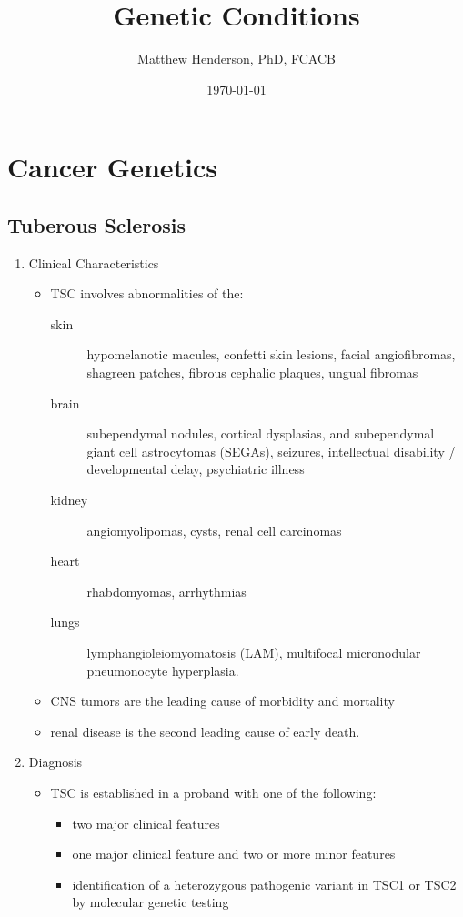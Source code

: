 \documentclass[12pt]{scrartcl}
\author{Matthew Henderson, PhD, FCACB}
\date{\today}
\title{Genetic Conditions}
\begin{document}
\maketitle
\setcounter{tocdepth}{2}
\tableofcontents


\section{Cancer Genetics}
\label{sec:org6510d46}
\subsection{Tuberous Sclerosis}
\label{sec:orgea0665a}
\begin{enumerate}
\item Clinical Characteristics
\label{sec:org8291ab3}
\begin{itemize}
\item TSC involves abnormalities of the:
\begin{description}
\item[{skin}] hypomelanotic macules, confetti skin lesions, facial
angiofibromas, shagreen patches, fibrous cephalic plaques,
ungual fibromas
\item[{brain}] subependymal nodules, cortical dysplasias, and
subependymal giant cell astrocytomas (SEGAs), seizures,
intellectual disability / developmental delay,
psychiatric illness
\item[{kidney}] angiomyolipomas, cysts, renal cell carcinomas
\item[{heart}] rhabdomyomas, arrhythmias
\item[{lungs}] lymphangioleiomyomatosis (LAM), multifocal micronodular
pneumonocyte hyperplasia.
\end{description}
\item CNS tumors are the leading cause of morbidity and mortality
\item renal disease is the second leading cause of early death.
\end{itemize}

\item Diagnosis
\label{sec:orgdeb826c}
\begin{itemize}
\item TSC is established in a proband with one of the following:
\begin{itemize}
\item two major clinical features
\item one major clinical feature and two or more minor features
\item identification of a heterozygous pathogenic variant in TSC1 or
TSC2 by molecular genetic testing
\end{itemize}
\end{itemize}


\end{enumerate}
\end{document}

